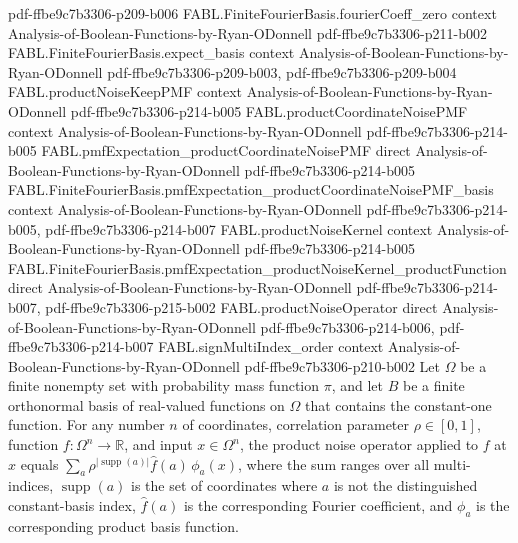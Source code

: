 \begin{theorem}
  {pdf-ffbe9c7b3306-p209-b006}
\proofstep
  {FABL.FiniteFourierBasis.fourierCoeff_zero}
  {context}
  {Analysis-of-Boolean-Functions-by-Ryan-ODonnell}
  {pdf-ffbe9c7b3306-p211-b002}
\proofstep
  {FABL.FiniteFourierBasis.expect_basis}
  {context}
  {Analysis-of-Boolean-Functions-by-Ryan-ODonnell}
  {pdf-ffbe9c7b3306-p209-b003,
    pdf-ffbe9c7b3306-p209-b004}
\proofstep
  {FABL.productNoiseKeepPMF}
  {context}
  {Analysis-of-Boolean-Functions-by-Ryan-ODonnell}
  {pdf-ffbe9c7b3306-p214-b005}
\proofstep
  {FABL.productCoordinateNoisePMF}
  {context}
  {Analysis-of-Boolean-Functions-by-Ryan-ODonnell}
  {pdf-ffbe9c7b3306-p214-b005}
\proofstep
  {FABL.pmfExpectation_productCoordinateNoisePMF}
  {direct}
  {Analysis-of-Boolean-Functions-by-Ryan-ODonnell}
  {pdf-ffbe9c7b3306-p214-b005}
\proofstep
  {FABL.FiniteFourierBasis.pmfExpectation_productCoordinateNoisePMF_basis}
  {context}
  {Analysis-of-Boolean-Functions-by-Ryan-ODonnell}
  {pdf-ffbe9c7b3306-p214-b005,
    pdf-ffbe9c7b3306-p214-b007}
\proofstep
  {FABL.productNoiseKernel}
  {context}
  {Analysis-of-Boolean-Functions-by-Ryan-ODonnell}
  {pdf-ffbe9c7b3306-p214-b005}
\proofstep
  {FABL.FiniteFourierBasis.pmfExpectation_productNoiseKernel_productFunction}
  {direct}
  {Analysis-of-Boolean-Functions-by-Ryan-ODonnell}
  {pdf-ffbe9c7b3306-p214-b007,
    pdf-ffbe9c7b3306-p215-b002}
\proofstep
  {FABL.productNoiseOperator}
  {direct}
  {Analysis-of-Boolean-Functions-by-Ryan-ODonnell}
  {pdf-ffbe9c7b3306-p214-b006,
    pdf-ffbe9c7b3306-p214-b007}
\proofstep
  {FABL.signMultiIndex_order}
  {context}
  {Analysis-of-Boolean-Functions-by-Ryan-ODonnell}
  {pdf-ffbe9c7b3306-p210-b002}
Let $\Omega$ be a finite nonempty set with probability mass function $\pi$, and let $B$
be a finite orthonormal basis of real-valued functions on $\Omega$ that contains the
constant-one function. For any number $n$ of coordinates, correlation parameter
$\rho\in[0,1]$, function $f\colon\Omega^n\to\mathbb R$, and input $x\in\Omega^n$, the
product noise operator applied to $f$ at $x$ equals $\sum_a
\rho^{|\operatorname{supp}(a)|}\widehat f(a)\,\phi_a(x)$, where the sum ranges over all
multi-indices, $\operatorname{supp}(a)$ is the set of coordinates where $a$ is not the
distinguished constant-basis index, $\widehat f(a)$ is the corresponding Fourier
coefficient, and $\phi_a$ is the corresponding product basis function.
\end{theorem}


